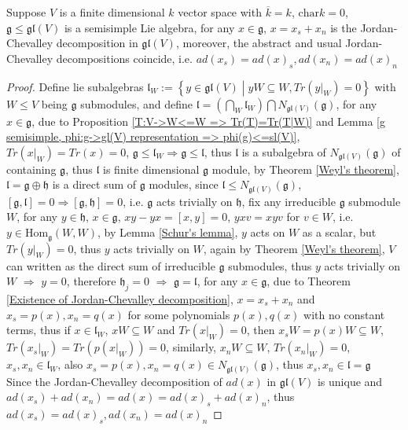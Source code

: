 \documentclass[main]{subfiles}
\begin{document}
\begin{theorem}\label{Semisimple Lie algebra contains the semisimple and nilpotent parts of its elements}
Suppose $V$ is a finite dimensional $k$ vector space with $\overline{k}=k$, $\mathrm{char}k=0$, $\mathfrak{g}\leq\mathfrak{gl}(V)$ is a semisimple Lie algebra, for any $x\in\mathfrak{g}$, $x=x_s+x_n$ is the Jordan-Chevalley decomposition in $\mathfrak{gl}(V)$, moreover, the abstract and usual Jordan-Chevalley decompositions coincide, i.e. $ad(x_s)=ad(x)_s,ad(x_n)=ad(x)_n$
\end{theorem}

\begin{proof}
Define lie subalgebras $\mathfrak{l}_W:=\left\{y\in\mathfrak{gl}(V) \middle|yW\subseteq W, Tr(y|_W)=0\right\}$ with $W\leq V$ being $\mathfrak{g}$ submodules, and define $\mathfrak{l}=\displaystyle\left(\bigcap_{W}\mathfrak{l}_W\right)\bigcap N_{\mathfrak{gl}(V)}(\mathfrak{g})$, for any $x\in\mathfrak{g}$, due to Proposition \ref{T:V->W<=W => Tr(T)=Tr(T|W)} and Lemma \ref{g semisimple, phi:g->gl(V) representation => phi(g)<=sl(V)}, $Tr(x|_W)=Tr(x)=0$, $\mathfrak{g}\leq\mathfrak{l}_W\Rightarrow\mathfrak{g}\leq\mathfrak{l}$, thus $\mathfrak{l}$ is a subalgebra of $N_{\mathfrak{gl}(V)}(\mathfrak{g})$ of containing $\mathfrak{g}$, thus $\mathfrak{l}$ is finite dimensional $\mathfrak{g}$ module, by Theorem \ref{Weyl's theorem}, $\mathfrak{l}=\mathfrak{g}\oplus\mathfrak{h}$ is a direct sum of $\mathfrak{g}$ modules, since $\mathfrak{l}\leq N_{\mathfrak{gl}(V)}(\mathfrak{g})$, $[\mathfrak{g},\mathfrak{l}]=0\Rightarrow[\mathfrak{g},\mathfrak{h}]=0$, i.e. $\mathfrak{g}$ acts trivially on $\mathfrak{h}$, fix any irreducible $\mathfrak{g}$ submodule $W$, for any $y\in\mathfrak{h}$, $x\in\mathfrak{g}$, $xy-yx=[x,y]=0$, $yxv=xyv$ for $v\in W$, i.e. $y\in\mathrm{Hom}_\mathfrak{g}(W,W)$, by Lemma \ref{Schur's lemma}, $y$ acts on $W$ as a scalar, but $Tr(y|_W)=0$, thus $y$ acts trivially on $W$, again by Theorem \ref{Weyl's theorem}, $V$ can written as the direct sum of irreducible $\mathfrak{g}$ submodules, thus $y$ acts trivially on $W$ $\Rightarrow$ $y=0$, therefore $\mathfrak{h}_j=0$ $\Rightarrow$ $\mathfrak{g}=\mathfrak{l}$, for any $x\in\mathfrak{g}$, due to Theorem \ref{Existence of Jordan-Chevalley decomposition}, $x=x_s+x_n$ and $x_s=p(x),x_n=q(x)$ for some polynomials $p(x),q(x)$ with no constant terms, thus if $x\in\mathfrak{l}_W$, $xW\subseteq W$ and $Tr(x|_W)=0$, then $x_sW=p(x)W\subseteq W$, $Tr(x_s|_W)=Tr(p(x|_W))=0$, similarly, $x_nW\subseteq W$, $Tr(x_n|_W)=0$, $x_s,x_n\in\mathfrak{l}_W$, also $x_s=p(x),x_n=q(x)\in N_{\mathfrak{gl}(V)}(\mathfrak{g})$, thus $x_s,x_n\in\mathfrak{l}=\mathfrak{g}$ \\
Since the Jordan-Chevalley decomposition of $ad(x)$ in $\mathfrak{gl}(V)$ is unique and $ad(x_s)+ad(x_n)=ad(x)=ad(x)_s+ad(x)_n$, thus $ad(x_s)=ad(x)_s,ad(x_n)=ad(x)_n$
\end{proof}
\end{document}
